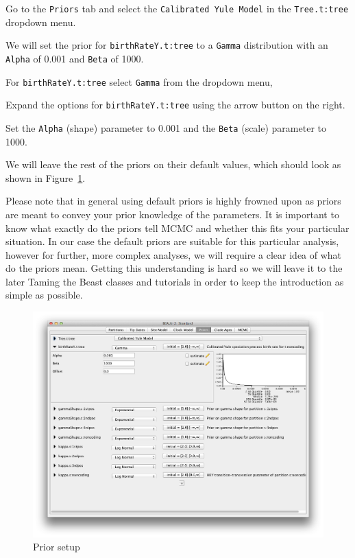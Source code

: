 \documentclass[11pt]{article}
\begin{document}
\begin{framed}
Go to the \texttt{Priors} tab and select the \texttt{Calibrated Yule Model} in the \texttt{Tree.t:tree} dropdown menu.
\end{framed}

We will set the prior for \texttt{birthRateY.t:tree} to a \texttt{Gamma} distribution with an \texttt{Alpha} of 0.001 and \texttt{Beta} of 1000.

\begin{framed}
For \texttt{birthRateY.t:tree} select \texttt{Gamma} from the dropdown menu,

Expand the options for \texttt{birthRateY.t:tree} using the arrow button on the right.

Set the \texttt{Alpha} (shape) parameter to 0.001 and the \texttt{Beta} (scale) parameter to 1000.
\end{framed}

We will leave the rest of the priors on their default values, which should look as shown in Figure~\ref{fig:priors}.

Please note that in general using default priors is highly frowned upon as priors are meant to convey your prior knowledge of the parameters. It is important to know what exactly do the priors tell MCMC and whether this fits your particular situation. In our case the default priors are suitable for this particular analysis, however for further, more complex analyses, we will require a clear idea of what do the priors mean. Getting this understanding is hard so we will leave it to the later Taming the Beast classes and tutorials in order to keep the introduction as simple as possible.

\begin{figure}[H]
\centering
\includegraphics[width=5in]{figures/priors.png}
\caption{\small Prior setup}
\label{fig:priors}
\end{figure}
\end{document}
